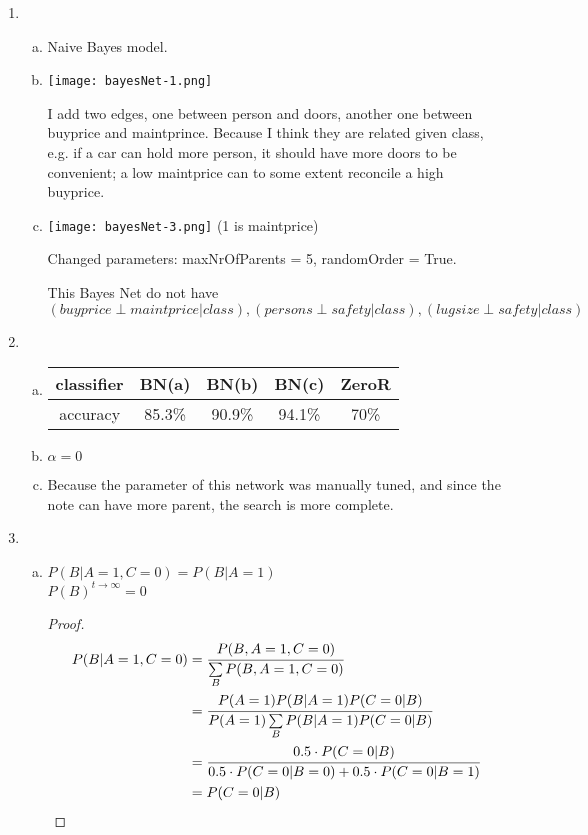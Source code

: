 \documentclass{article}
\theoremstyle{quest}
\begin{document}
\begin{enumerate}
\item
	\begin{enumerate}[a.]
	\item
	Naive Bayes model.
	\item
		\texttt{[image: bayesNet-1.png]}
		
		I add two edges, one between person and doors, another one between buyprice and maintprince. Because I think they are related given class, e.g. if a car can hold more person, it should have more doors to be convenient; a low maintprice can to some extent reconcile a high buyprice.
	\item
	    \texttt{[image: bayesNet-3.png]}  (1 is maintprice)
	    
	    Changed parameters: maxNrOfParents = 5, randomOrder = True.
	    
	    This Bayes Net do not have $(buyprice \perp maintprice| class), (persons \perp safety|class), (lugsize \perp safety|class)$
	\end{enumerate}
\item
	\begin{enumerate}[a.]
	\item
	\begin{tabular}{ccccc}
	\hline
	classifier & BN(a)&BN(b) &BN(c) & ZeroR\\ \hline
	accuracy & 85.3\% & 90.9\% & 94.1\% & 70\% \\ \hline
	\end{tabular}
	\item
	$\alpha = 0$
	\item
	Because the parameter of this network was manually tuned, and since the note can have more parent, the search is more complete.
	\end{enumerate}
\item
	\begin{enumerate}[a.]
	\item
	$P(B|A=1, C=0) = P(B|A=1)$\\
	$P(B)^{t\rightarrow \infty} = 0$
	\begin{proof}
	\begin{align*}
	P(B|A=1,C=0) &= \cfrac{P(B, A=1, C=0)}{\sum\limits_B P(B, A=1, C= 0)} \\
	                      &= \cfrac{P(A=1)P(B|A=1)P(C=0|B)}{P(A=1)\sum\limits_B P(B|A=1)P(C=0|B)} \\
	                      &= \cfrac{0.5\cdot P(C=0|B)}{0.5\cdot P(C=0|B=0) + 0.5\cdot P(C=0|B=1)} \\
	                      &= P(C=0|B) 	
	\end{align*}
	

\end{proof}
\end{enumerate}
\end{enumerate}
\end{document}
